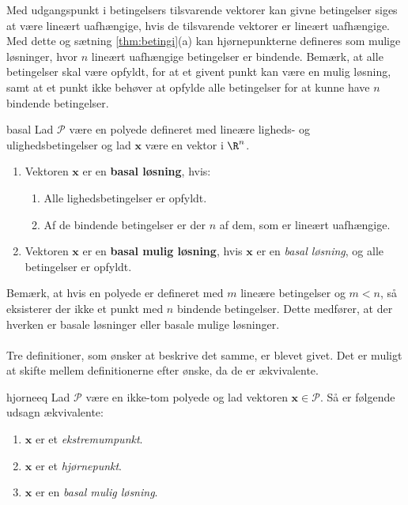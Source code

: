 %
Med udgangspunkt i betingelsers tilsvarende vektorer kan givne betingelser siges at være lineært uafhængige, hvis de tilsvarende vektorer er lineært uafhængige.
Med dette og sætning \ref{thm:betingi}(a) kan hjørnepunkterne defineres som mulige løsninger, hvor $n$ lineært uafhængige betingelser er bindende.
Bemærk, at alle betingelser skal være opfyldt, for at et givent punkt kan være en mulig løsning, samt at et punkt ikke behøver at opfylde alle betingelser for at kunne have $n$ bindende betingelser.
%
\begin{defn}{}{basal}
Lad $\mathcal{P}$ være en polyede defineret med lineære ligheds- og ulighedsbetingelser og lad $\textbf{x}$ være en vektor i $\R^n$.
%
\begin{enumerate}[label=(\alph*)]
\item Vektoren $\textbf{x}$ er en \textbf{basal løsning}, hvis:
%
\begin{enumerate}[label=(\roman*)]
\item Alle lighedsbetingelser er opfyldt.
\item Af de bindende betingelser er der $n$ af dem, som er lineært uafhængige.
\end{enumerate}
%
\item Vektoren $\textbf{x}$ er en \textbf{basal mulig løsning}, hvis $\textbf{x}$ er en \textit{basal løsning}, og alle betingelser er opfyldt.
\end{enumerate}
\end{defn}\noindent
%
Bemærk, at hvis en polyede er defineret med $m$ lineære betingelser og $m<n$, så eksisterer der ikke et punkt med $n$ bindende betingelser.
Dette medfører, at der hverken er basale løsninger eller basale mulige løsninger.\\\\
%
Tre definitioner, som ønsker at beskrive det samme, er blevet givet.
Det er muligt at skifte mellem definitionerne efter ønske, da de er ækvivalente.
%
\begin{thm}{}{hjorneeq}
Lad $\mathcal{P}$ være en ikke-tom polyede og lad vektoren $\textbf{x}\in \mathcal{P}$.
Så er følgende udsagn ækvivalente:
%
\begin{enumerate}[label=(\alph*)]
\item $\textbf{x}$ er et \textit{ekstremumpunkt}.
\item $\textbf{x}$ er et \textit{hjørnepunkt}.
\item $\textbf{x}$ er en \textit{basal mulig løsning}.
\end{enumerate}
%
\end{thm}
